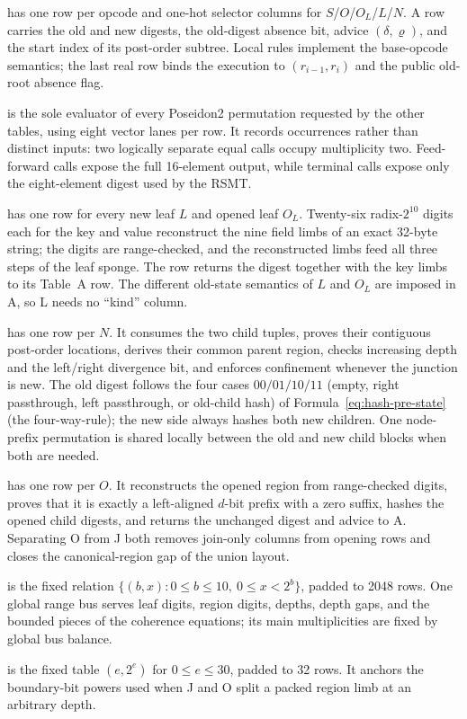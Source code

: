 \documentclass[11pt]{article}
\begin{document}
\begin{description}[nosep]
    \item[Table A (opcode execution)] has one row per opcode and one-hot selector columns for $S$\slash$O$\slash$O_L$\slash$L$\slash$N$. A row carries the old and new digests, the old-digest absence bit, advice $(\delta,\varrho)$, and the start index of its post-order subtree. Local rules implement the base-opcode semantics; the last real row binds the execution to $(r_{i-1},r_i)$ and the public old-root absence flag.
    \item[Table B (Poseidon2)] is the sole evaluator of every Poseidon2 permutation requested by the other tables, using eight vector lanes per row. It records occurrences rather than distinct inputs: two logically separate equal calls occupy multiplicity two. Feed-forward calls expose the full 16-element output, while terminal calls expose only the eight-element digest used by the RSMT.
    \item[Table L (canonical leaves)] has one row for every new leaf $L$ and opened leaf $O_L$. Twenty-six radix-$2^{10}$ digits each for the key and value reconstruct the nine field limbs of an exact 32-byte string; the digits are range-checked, and the reconstructed limbs feed all three steps of the leaf sponge. The row returns the digest together with the key limbs to its Table~A row. The different old-state semantics of $L$ and $O_L$ are imposed in A, so L needs no ``kind'' column.
    \item[Table J (junction joins)] has one row per $N$. It consumes the two child tuples, proves their contiguous post-order locations, derives their common parent region, checks increasing depth and the left/right divergence bit, and enforces confinement whenever the junction is new. The old digest follows the four cases $00/01/10/11$ (empty, right passthrough, left passthrough, or old-child hash) of Formula~\ref{eq:hash-pre-state} (the four-way-rule); the new side always hashes both new children. One node-prefix permutation is shared locally between the old and new child blocks when both are needed.
    \item[Table O (canonical junction openings)] has one row per $O$. It reconstructs the opened region from range-checked digits, proves that it is exactly a left-aligned $d$-bit prefix with a zero suffix, hashes the opened child digests, and returns the unchanged digest and advice to A. Separating O from J both removes join-only columns from opening rows and closes the canonical-region gap of the union layout.
    \item[Table R (range)] is the fixed relation $\{(b,x):0\leq b\leq10,\ 0\leq x<2^b\}$, padded to 2048 rows. One global range bus serves leaf digits, region digits, depths, depth gaps, and the bounded pieces of the coherence equations; its main multiplicities are fixed by global bus balance.
    \item[Table P (powers)] is the fixed table $(e,2^e)$ for $0\leq e\leq30$, padded to 32 rows. It anchors the boundary-bit powers used when J and O split a packed region limb at an arbitrary depth.
\end{description}
\end{document}
